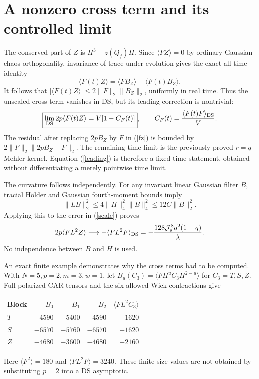 \documentclass[11pt,a4paper]{article}
\newcommand{\Js}{\mathcal J_s}
\newcommand{\av}[1]{\langle #1\rangle}
\begin{document}
\newpage
\section{A nonzero cross term and its controlled limit}
The conserved part of $Z$ is $H^3-\bar z(Q_f)H$. Since
$\av{FZ}=0$ by ordinary Gaussian-chaos orthogonality, invariance
of trace under evolution gives the exact all-time identity
\begin{equation}
 \boxed{\av{F(t)Z}=\av{FB_Z}-\av{F(t)B_Z}.}\label{fz}
\end{equation}
It follows that $|\av{F(t)Z}|\leq2\|F\|_2\|B_Z\|_2$, uniformly
in real time. Thus the unscaled cross term vanishes in DS, but its
leading correction is nontrivial:
\begin{equation}
 \boxed{\lim_{\rm DS}2p\av{F(t)Z}=V[1-C_F(t)]},\qquad
 C_F(t)=\frac{\av{F(t)F}_{\rm DS}}V.\label{leading}
\end{equation}
The residual after replacing $2pB_Z$ by $F$ in (\ref{fz}) is
bounded by $2\|F\|_2\|2pB_Z-F\|_2$. The remaining time limit
is the previously proved $r=q$ Mehler kernel. Equation
(\ref{leading}) is therefore a fixed-time statement, obtained
without differentiating a merely pointwise time limit.

The curvature follows independently. For any invariant linear
Gaussian filter $B$, tracial H\"older and Gaussian fourth-moment
bounds imply
\[
 \|LB\|_2^2\leq4\|H\|_4^2\|B\|_4^2
 \leq12C\|B\|_2^2.
\]
Applying this to the error in (\ref{scale}) proves
\begin{equation}
 2p\av{F L^2Z}\longrightarrow-\av{F L^2F}_{\rm DS}
 =-\frac{128\Js^8q^2(1-q)}\lambda.\label{m2}
\end{equation}
No independence between $B$ and $H$ is used.

An exact finite example demonstrates why the cross terms had to be
computed. With $N=5,p=2,m=3,w=1$, let
$B_u(C_3)=\av{FH^u C_3 H^{2-u}}$ for $C_3=T,S,Z$. Full
polarized CAR tensors and the six allowed Wick contractions give
\begin{center}
\begin{tabular}{lrrrr}\toprule
Block & $B_0$ & $B_1$ & $B_2$ & $\av{F L^2 C_3}$\\\midrule
$T$ &4590&5400&4590&$-1620$\\
$S$ &$-6570$&$-5760$&$-6570$&$-1620$\\
$Z$ &$-4680$&$-3600$&$-4680$&$-2160$\\\bottomrule
\end{tabular}
\end{center}
Here $\av{F^2}=180$ and $\av{FL^2F}=3240$. These finite-size
values are not obtained by substituting $p=2$ into a DS asymptotic.
\end{document}
